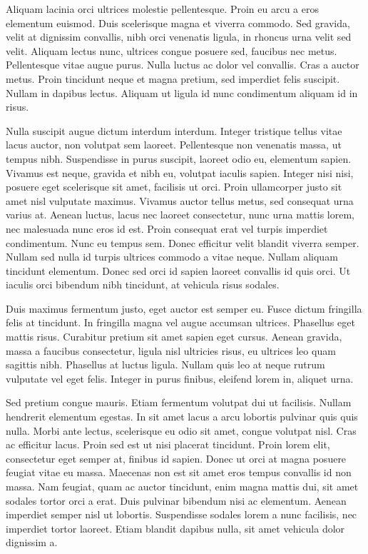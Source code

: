 Aliquam lacinia orci ultrices molestie pellentesque. Proin eu arcu a eros elementum euismod. Duis scelerisque magna et viverra commodo. Sed gravida, velit at dignissim convallis, nibh orci venenatis ligula, in rhoncus urna velit sed velit. Aliquam lectus nunc, ultrices congue posuere sed, faucibus nec metus. Pellentesque vitae augue purus. Nulla luctus ac dolor vel convallis. Cras a auctor metus. Proin tincidunt neque et magna pretium, sed imperdiet felis suscipit. Nullam in dapibus lectus. Aliquam ut ligula id nunc condimentum aliquam id in risus.

Nulla suscipit augue dictum interdum interdum. Integer tristique tellus vitae lacus auctor, non volutpat sem laoreet. Pellentesque non venenatis massa, ut tempus nibh. Suspendisse in purus suscipit, laoreet odio eu, elementum sapien. Vivamus est neque, gravida et nibh eu, volutpat iaculis sapien. Integer nisi nisi, posuere eget scelerisque sit amet, facilisis ut orci. Proin ullamcorper justo sit amet nisl vulputate maximus. Vivamus auctor tellus metus, sed consequat urna varius at. Aenean luctus, lacus nec laoreet consectetur, nunc urna mattis lorem, nec malesuada nunc eros id est. Proin consequat erat vel turpis imperdiet condimentum. Nunc eu tempus sem. Donec efficitur velit blandit viverra semper. Nullam sed nulla id turpis ultrices commodo a vitae neque. Nullam aliquam tincidunt elementum. Donec sed orci id sapien laoreet convallis id quis orci. Ut iaculis orci bibendum nibh tincidunt, at vehicula risus sodales.

Duis maximus fermentum justo, eget auctor est semper eu. Fusce dictum fringilla felis at tincidunt. In fringilla magna vel augue accumsan ultrices. Phasellus eget mattis risus. Curabitur pretium sit amet sapien eget cursus. Aenean gravida, massa a faucibus consectetur, ligula nisl ultricies risus, eu ultrices leo quam sagittis nibh. Phasellus at luctus ligula. Nullam quis leo at neque rutrum vulputate vel eget felis. Integer in purus finibus, eleifend lorem in, aliquet urna.

Sed pretium congue mauris. Etiam fermentum volutpat dui ut facilisis. Nullam hendrerit elementum egestas. In sit amet lacus a arcu lobortis pulvinar quis quis nulla. Morbi ante lectus, scelerisque eu odio sit amet, congue volutpat nisl. Cras ac efficitur lacus. Proin sed est ut nisi placerat tincidunt. Proin lorem elit, consectetur eget semper at, finibus id sapien. Donec ut orci at magna posuere feugiat vitae eu massa. Maecenas non est sit amet eros tempus convallis id non massa. Nam feugiat, quam ac auctor tincidunt, enim magna mattis dui, sit amet sodales tortor orci a erat. Duis pulvinar bibendum nisi ac elementum. Aenean imperdiet semper nisl ut lobortis. Suspendisse sodales lorem a nunc facilisis, nec imperdiet tortor laoreet. Etiam blandit dapibus nulla, sit amet vehicula dolor dignissim a.

